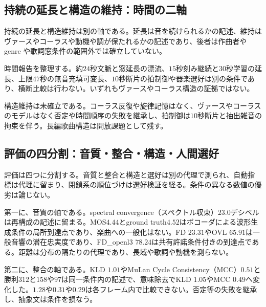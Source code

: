 \documentclass[lualatex,a4paper,10pt]{jlreq}
\begin{document}
\subsection{持続の延長と構造の維持：時間の二軸}
持続の延長と構造維持は別の軸である\autocite{btd063,btd065,btd068,btd069}。延長は音を続けられるかの記述、維持はヴァースやコーラスや動機や調が保たれるかの記述であり、後者は作曲者や genre や歌詞窓条件の範囲外では確立していない\autocite{btd063,btd065}。

時間報告を整理する。約$24$秒文脈と窓延長の漂流\autocite{btd063}、$15$秒刻み継続と$30$秒学習の延長\autocite{btd065}、上限$47$秒の無音充填可変長\autocite{btd068}、$10$秒断片の拍制御や器楽選好\autocite{btd069,btd136}は別の条件であり、横断比較は行わない\autocite{btd063,btd065,btd068,btd069,btd136}。いずれもヴァースやコーラス構造の証拠ではない\autocite{btd065,btd068,btd069}。

構造維持は未確立である。コーラス反復や旋律記憶はなく\autocite{btd063}、ヴァースやコーラスのモデルはなく否定や時間順序の失敗を継承し\autocite{btd065}、拍制御は$10$秒断片と抽出雑音の拘束を伴う\autocite{btd069}。長編歌曲構造は開放課題として残す\autocite{btd136}。

\subsection{評価の四分割：音質・整合・構造・人間選好}
評価は四つに分割する。音質と整合と構造と選好は別の代理で測られ、自動指標は代理に留まり、閉鎖系の順位づけは選好検証を経る\autocite{btd063,btd065,btd066,btd067,btd068,btd069,btd136}。条件の異なる数値の優劣は論じない\autocite{btd063,btd065,btd066,btd067,btd068,btd136}。

第一に、音質の軸である。spectral convergence（スペクトル収束）$23.0$デシベルは再構成の記述に留まる\autocite{btd063}。MOS$4.44$とground truth$4.52$はボコーダによる波形生成条件の局所到達点であり、楽曲への一般化はない\autocite{btd064}。FD $23.31$やOVL $65.91$は一般音響の潜在忠実度であり、FD\_openl3 $78.24$は共有許諾条件付きの到達点である\autocite{btd067,btd068}。距離は分布の隔たりの代理であり、長域や歌詞や動機を測らない\autocite{btd063,btd065,btd136}。

第二に、整合の軸である。KLD $1.01$やMuLan Cycle Consistency（MCC）$0.51$と勝利$312$と$158$や$97$は同一条件内の記述で、意味除去でKLD $1.05$やMCC $0.49$へ変化した\autocite{btd065}。$1.28$や$0.31$や$0.29$は各フレーム内で比較できない\autocite{btd066,btd068}。否定等の失敗を継承し\autocite{btd065}、抽象文は条件を損なう\autocite{btd067}。
\end{document}
